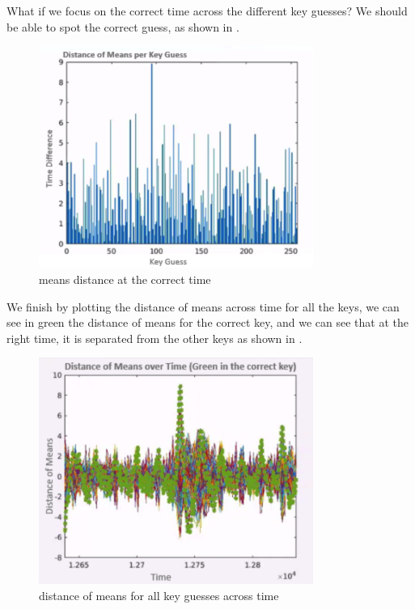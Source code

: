 What if we focus on the correct time across the different key guesses? We should be able to spot the correct guess, as shown in .

\begin{figure}[!ht]
    \centering
    \includegraphics[width=0.8\textwidth]{images/Lecture6/the-correct-time.png}
    \caption{means distance at the correct time} \label{fig:the-correct-time}
\end{figure}

We finish by plotting the distance of means across time for all the keys, we can see in green the distance of means for the correct key, and we can see that at the right time, it is separated from the other keys as shown in .

\begin{figure}[!ht]
    \centering
    \includegraphics[width=0.8\textwidth]{images/Lecture6/all.png}
    \caption{distance of means for all key guesses across time} \label{fig:all}
\end{figure}
